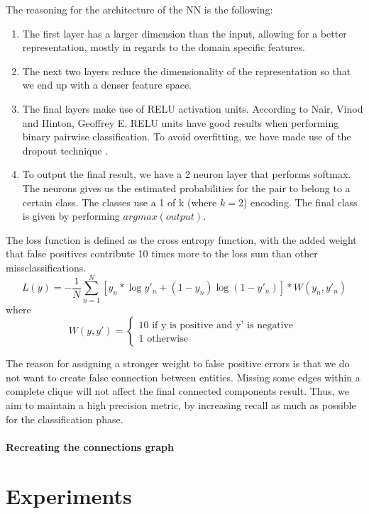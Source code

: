 The reasoning for the architecture of the NN is the following:
\begin{enumerate}
\item
  The first layer has a larger dimension than the input, allowing for a better
  representation, mostly in regards to the domain specific features.
\item
  The next two layers reduce the dimensionality of the representation so that
  we end up with a denser feature space.
\item
  The final layers make use of RELU activation units. According to Nair, Vinod
  and Hinton, Geoffrey E. \cite{nair2010rectified} RELU units have good results
  when performing binary pairwise classification.
  To avoid overfitting, we have made use of the dropout technique \cite{srivastava2014dropout}.
\item
  To output the final result, we have a 2 neuron layer that performs softmax.
  The neurons gives us the estimated probabilities for the pair to belong to
  a certain class. The classes use a 1 of k (where $ k = 2 $) encoding.
  The final class is given by performing $ argmax(output) $.
\end{enumerate}
The loss function is defined as the cross entropy function, with the added weight
that false positives contribute 10 times more to the loss sum than other
missclassifications.
\[
  L(y) = -\frac{1}{N}\sum_{n=1}^N[y_n * \log y'_n + (1 - y_n)\log (1 - y'_n)] * W(y_n, y'_n)
\]
where
\[ W(y, y') =
    \left\{
        \begin{array}{ll}
            10 \mbox{ if y is positive and y' is negative } \\
            1 \mbox{ otherwise }
        \end{array}
    \right.
\]

The reason for assigning a stronger weight to false positive errors is that we
do not want to create false connection between entities. Missing some edges
within a complete clique will not affect the final connected components result.
Thus, we aim to maintain a high precision metric, by increasing recall as much as
possible for the classification phase.

\subsubsection {Recreating the connections graph}

\chapter{Experiments}
\label{chapter:testing}

